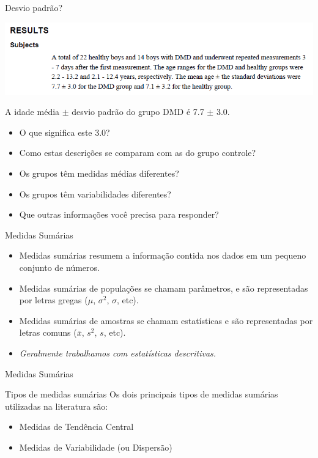 \documentclass{beamer}
\begin{document}
\begin{frame}{Desvio padrão?}
  \begin{center}
    \includegraphics[width=1\textwidth]{Cap3/DP2}
  \end{center}

  \begin{block}{}
    A idade média $\pm$ desvio padrão do grupo DMD é 7.7 $\pm$ 3.0.

    \begin{itemize}
    \item O que significa este 3.0?
    \item Como estas descrições se comparam com as do grupo controle?
    \item \alert{Os grupos têm medidas médias diferentes?}
    \item \alert{Os grupos têm variabilidades diferentes?}
    \item Que outras informações você precisa para responder?
    \end{itemize}
  \end{block}
\end{frame}

\begin{frame}{Medidas Sumárias}
  \begin{itemize}
  \item Medidas sumárias resumem a informação contida nos dados em um
    pequeno conjunto de números.
  \item Medidas sumárias de \alert{populações} se chamam
    \alert{parâmetros}, e são representadas por letras gregas ($\mu$, $\sigma^2$, $\sigma$, etc).
  \item Medidas sumárias de \alert{amostras} se chamam \alert{estatísticas} e são representadas por letras comuns ($\bar{x}$, $s^2$, $s$, etc).
  \item {\em Geralmente trabalhamos com estatísticas descritivas.}
  \end{itemize}
\end{frame}

\begin{frame}{Medidas Sumárias}
  \begin{block}{Tipos de medidas sumárias}
    Os dois principais tipos de medidas sumárias utilizadas na literatura são:
    \begin{itemize}
    \item Medidas de Tendência Central
    \item Medidas de Variabilidade (ou Dispersão)
    \end{itemize}
  \end{block}
\end{frame}
\end{document}

